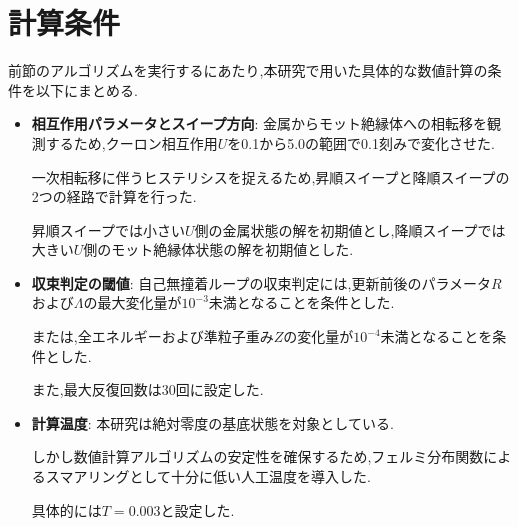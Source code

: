 \section{計算条件}

前節のアルゴリズムを実行するにあたり,本研究で用いた具体的な数値計算の条件を以下にまとめる.

\begin{itemize}
    \item \textbf{相互作用パラメータとスイープ方向}:
    金属からモット絶縁体への相転移を観測するため,クーロン相互作用$U$を0.1から5.0の範囲で0.1刻みで変化させた.

    一次相転移に伴うヒステリシスを捉えるため,昇順スイープと降順スイープの2つの経路で計算を行った.

    昇順スイープでは小さい$U$側の金属状態の解を初期値とし,降順スイープでは大きい$U$側のモット絶縁体状態の解を初期値とした.
    
    \item \textbf{収束判定の閾値}:
    自己無撞着ループの収束判定には,更新前後のパラメータ$R$および$\Lambda$の最大変化量が$10^{-3}$未満となることを条件とした.

    または,全エネルギーおよび準粒子重み$Z$の変化量が$10^{-4}$未満となることを条件とした.

    また,最大反復回数は30回に設定した.
    
    \item \textbf{計算温度}:
    本研究は絶対零度の基底状態を対象としている.

    しかし数値計算アルゴリズムの安定性を確保するため,フェルミ分布関数によるスマアリングとして十分に低い人工温度を導入した.

    具体的には$T = 0.003$と設定した.
\end{itemize}